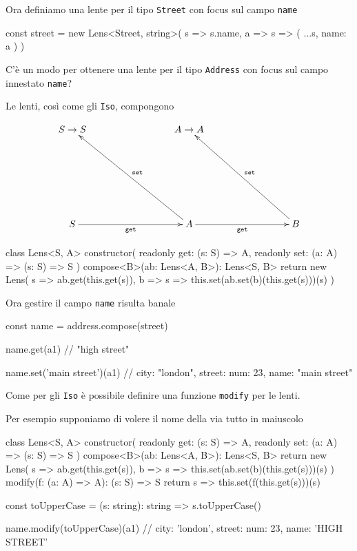 \documentclass[12pt]{article}
\theoremstyle{definition}
\newenvironment{code}
  {\vspace{0.5cm} \VerbatimEnvironment\begin{typescriptcode}}
  {\end{typescriptcode} \vspace{0.2cm}}
\begin{document}
Ora definiamo una lente per il tipo \texttt{Street} con focus sul campo \texttt{name}

\begin{code}
const street = new Lens<Street, string>(
  s => s.name,
  a => s => ({ ...s, name: a })
)
\end{code}

C'è un modo per ottenere una lente per il tipo \texttt{Address} con focus sul campo innestato \texttt{name}?

Le lenti, così come gli \texttt{Iso}, compongono

\[
\xymatrixrowsep{3cm}
\xymatrixcolsep{3cm}
\xymatrix{
  {S \rightarrow S} & {A \rightarrow A} \\
  S \ar[r]_{\texttt{get}} & A \ar[lu]_{\texttt{set}} \ar[r]_{\texttt{get}} & B \ar[lu]_{\texttt{set}}
}
\]

\begin{code}
class Lens<S, A> {
  constructor(
    readonly get: (s: S) => A,
    readonly set: (a: A) => (s: S) => S
  ) {}
  compose<B>(ab: Lens<A, B>): Lens<S, B> {
    return new Lens(
      s => ab.get(this.get(s)),
      b => s => this.set(ab.set(b)(this.get(s)))(s)
    )
  }
}
\end{code}

Ora gestire il campo \texttt{name} risulta banale

\begin{code}
const name = address.compose(street)

name.get(a1)
// "high street"

name.set('main street')(a1)
// { city: "london", street: { num: 23, name: "main street" } }
\end{code}

Come per gli \texttt{Iso} è possibile definire una funzione \texttt{modify} per le lenti.

Per esempio supponiamo di volere il nome della via tutto in maiuscolo

\begin{code}
class Lens<S, A> {
  constructor(
    readonly get: (s: S) => A,
    readonly set: (a: A) => (s: S) => S
  ) {}
  compose<B>(ab: Lens<A, B>): Lens<S, B> {
    return new Lens(
      s => ab.get(this.get(s)),
      b => s => this.set(ab.set(b)(this.get(s)))(s)
    )
  }
  modify(f: (a: A) => A): (s: S) => S {
    return s => this.set(f(this.get(s)))(s)
  }
}

const toUpperCase = (s: string): string => s.toUpperCase()

name.modify(toUpperCase)(a1)
// { city: 'london', street: { num: 23, name: 'HIGH STREET' } }
\end{code}
\end{document}
